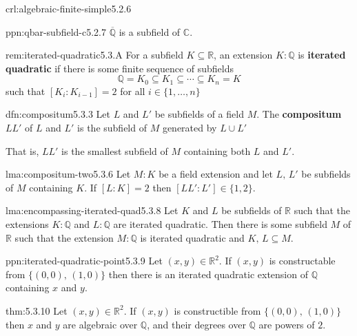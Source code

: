 \documentclass[landscape, 8pt]{extarticle}
\begin{document}
\begin{multicols}{3}
\begin{crl}{crl:algebraic-finite-simple}{5.2.6}
\end{crl}

\begin{ppn}[]{ppn:qbar-subfield-c}{5.2.7}
    $\overline{\mathbb{Q}}$ is a subfield of $\mathbb{C}$.
\end{ppn}

\begin{rem}{rem:iterated-quadratic}{5.3.A}
    For a subfield $K \subseteq \mathbb{R}$, an extension $K : \mathbb{Q}$ is \textbf{iterated quadratic} if there is some finite sequence of subfields
    \[\mathbb{Q} = K_{0} \subseteq K_{1} \subseteq \cdots \subseteq K_{n} = K\]
    such that $[K_{i} : K_{i-1}] = 2$ for all $i\in \{1,\dots,n\}$
\end{rem}

\begin{dfn}[Compositum]{dfn:compositum}{5.3.3}
    Let $L$ and $L'$ be subfields of a field $M$. The \textbf{compositum $LL'$} of $L$ and $L'$ is the subfield of $M$ generated by $L \cup L'$

    That is, $LL'$ is the smallest subfield of $M$ containing both $L$ and $L'$.
\end{dfn}

\begin{lma}[]{lma:compositum-two}{5.3.6}
    Let $M : K$ be a field extension and let $L,\, L'$ be subfields of $M$ containing $K$. If $[L : K] = 2$ then $[LL':L'] \in \{1,2\}$.
\end{lma}

\begin{lma}[]{lma:encompassing-iterated-quad}{5.3.8}
    Let $K$ and $L$ be subfields of $\mathbb{R}$ such that the extensions $K : \mathbb{Q}$ and $L : \mathbb{Q}$ are iterated quadratic. Then there is some subfield $M$ of $\mathbb{R}$ such that the extension $M : \mathbb{Q}$ is iterated quadratic and $K,\, L \subseteq M$.
\end{lma}

\begin{ppn}{ppn:iterated-quadratic-point}{5.3.9}
    Let $(x,y)\in \mathbb{R}^{2}$. If $(x,y)$ is constructable from $\{(0,0),\, (1,0)\}$ then there is an iterated quadratic extension of $\mathbb{Q}$ containing $x$ and $y$.
\end{ppn}

\begin{thm}{thm:}{5.3.10}
    Let $(x,y)\in \mathbb{R}^{2}$. If $(x,y)$ is constructible from $\{(0,0),\, (1,0)\}$ then $x$ and $y$ are algebraic over $\mathbb{Q}$, and their degrees over $\mathbb{Q}$ are powers of $2$.
\end{thm}


\end{multicols}
\end{document}
